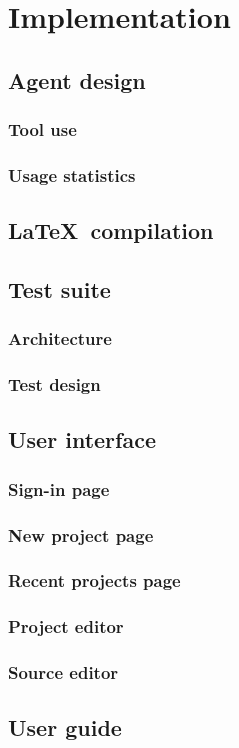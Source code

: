 \section{Implementation}

\subsection{Agent design}

\subsubsection{Tool use}
\subsubsection{Usage statistics}

\subsection{\LaTeX\ compilation}

\subsection{Test suite}

\subsubsection{Architecture}
\subsubsection{Test design}

\subsection{User interface}

\subsubsection{Sign-in page}
\subsubsection{New project page}
\subsubsection{Recent projects page}
\subsubsection{Project editor}
\subsubsection{Source editor}

\subsection{User guide}
